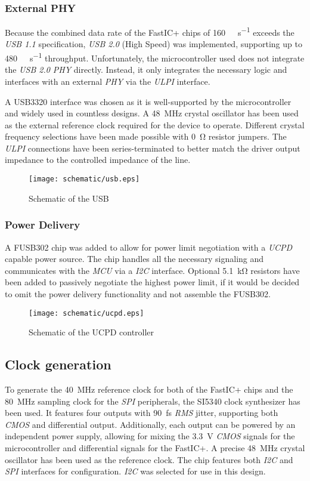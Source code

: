 \subsubsection{External PHY}
Because the combined data rate of the FastIC+ chips of \SI{160}{\mega\bit\per\second} exceeds the \emph{USB 1.1} specification, \emph{USB 2.0} (High Speed) was implemented, supporting up to \SI{480}{\mega\bit\per\second} throughput. Unfortunately, the microcontroller used does not integrate the \emph{USB 2.0 PHY} directly. Instead, it only integrates the necessary logic and interfaces with an external \emph{PHY} via the \emph{ULPI} interface. 

A USB3320 interface was chosen as it is well-supported by the microcontroller and widely used in countless designs. A \SI{48}{\mega\hertz} crystal oscillator has been used as the external reference clock required for the device to operate. Different crystal frequency selections have been made possible with \SI{0}{\ohm} resistor jumpers. The \emph{ULPI} connections have been series-terminated to better match the driver output impedance to the controlled impedance of the line.
\FloatBarrier
\begin{figure}[htp!]
    \centering
    \texttt{[image: schematic/usb.eps]}
    \caption{Schematic of the USB}
    \label{fig:schem_usb}
\end{figure}
\FloatBarrier
\subsubsection{Power Delivery}
A FUSB302 chip was added to allow for power limit negotiation with a \emph{UCPD} capable power source. The chip handles all the necessary signaling and communicates with the \emph{MCU} via a \emph{I2C} interface. Optional \SI{5.1}{\kilo\ohm} resistors have been added to passively negotiate the highest power limit, if it would be decided to omit the power delivery functionality and not assemble the FUSB302.
\FloatBarrier
\begin{figure}[htp!]
    \centering
    \texttt{[image: schematic/ucpd.eps]}
    \caption{Schematic of the UCPD controller}
    \label{fig:schem_ucpd}
\end{figure}
\FloatBarrier
\subsection{Clock generation}
To generate the \SI{40}{\mega\hertz} reference clock for both of the FastIC+ chips and the \SI{80}{\mega\hertz} sampling clock for the \emph{SPI} peripherals, the SI5340 clock synthesizer has been used. It features four outputs with \SI{90}{\femto\second} \emph{RMS} jitter, supporting both \emph{CMOS} and differential output. Additionally, each output can be powered by an independent power supply, allowing for mixing the \SI{3.3}{\volt} \emph{CMOS} signals for the microcontroller and differential signals for the FastIC+. A precise \SI{48}{\mega\hertz} crystal oscillator has been used as the reference clock. The chip features both \emph{I2C} and \emph{SPI} interfaces for configuration. \emph{I2C} was selected for use in this design.

